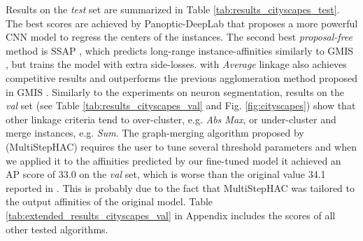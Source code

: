 Results on the \emph{test} set are summarized in Table \ref{tab:results_cityscapes_test}. The best scores are achieved by Panoptic-DeepLab \cite{cheng2019panopticdeeplab} that proposes a more powerful CNN model to regress the centers of the instances. The second best \emph{proposal-free} method is SSAP \cite{Gao_2019_ICCV}, which predicts long-range instance-affinities similarly to GMIS \cite{liu2018affinity}, but trains the model with extra side-losses. \algname{} with \emph{Average} linkage also achieves competitive results and outperforms the previous agglomeration method proposed in GMIS \cite{liu2018affinity}. Similarly to the experiments on neuron segmentation, results on the \emph{val} set (see Table \ref{tab:results_cityscapes_val} and Fig. \ref{fig:cityscapes}) show that other \algname{} linkage criteria tend to over-cluster, e.g. \emph{Abs Max}, or under-cluster and merge instances, e.g. \emph{Sum}. The graph-merging algorithm proposed by \cite{liu2018affinity} (MultiStepHAC) requires the user to tune several threshold parameters and when we applied it to the affinities predicted by our fine-tuned model it achieved an AP score of 33.0 on the \emph{val} set, which is worse than the original value 34.1 reported in \cite{liu2018affinity}. This is probably due to the fact that MultiStepHAC was tailored to the output affinities of the original model. 
Table \ref{tab:extended_results_cityscapes_val} in Appendix includes the scores of all other tested \algname{} algorithms.

